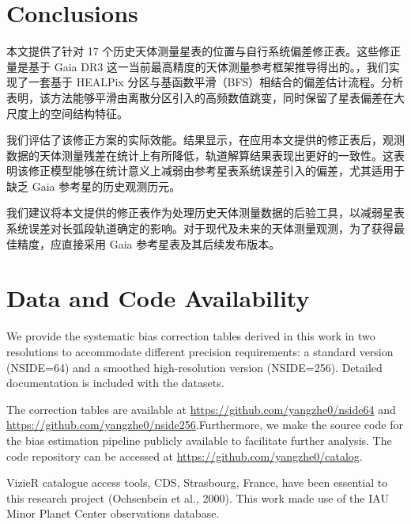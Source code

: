 \documentclass{aastex701}
\begin{document}
\section{Conclusions} \label{sec:conclusions}

本文提供了针对 17 个历史天体测量星表的位置与自行系统偏差修正表。这些修正量是基于 Gaia DR3 这一当前最高精度的天体测量参考框架推导得出的。，我们实现了一套基于 HEALPix 分区与基函数平滑（BFS）相结合的偏差估计流程。分析表明，该方法能够平滑由离散分区引入的高频数值跳变，同时保留了星表偏差在大尺度上的空间结构特征。

我们评估了该修正方案的实际效能。结果显示，在应用本文提供的修正表后，观测数据的天体测量残差在统计上有所降低，轨道解算结果表现出更好的一致性。这表明该修正模型能够在统计意义上减弱由参考星表系统误差引入的偏差，尤其适用于缺乏 Gaia 参考星的历史观测历元。

我们建议将本文提供的修正表作为处理历史天体测量数据的后验工具，以减弱星表系统误差对长弧段轨道确定的影响。对于现代及未来的天体测量观测，为了获得最佳精度，应直接采用 Gaia 参考星表及其后续发布版本。

\section{Data and Code Availability} \label{sec:data}

We provide the systematic bias correction tables derived in this work in two resolutions to accommodate different precision requirements: a standard version (NSIDE=64) and a smoothed high-resolution version (NSIDE=256). Detailed documentation is included with the datasets.

The correction tables are available at \url{https://github.com/yangzhe0/nside64} and \url{https://github.com/yangzhe0/nside256}.Furthermore, we make the source code for the bias estimation pipeline publicly available to facilitate further analysis. The code repository can be accessed at \url{https://github.com/yangzhe0/catalog}.


\begin{acknowledgments}
    VizieR catalogue access tools, CDS, Strasbourg, France, have been essential to this research project (Ochsenbein et al., 2000). This work made use of the IAU Minor Planet Center observations database.
\end{acknowledgments}
\end{document}
